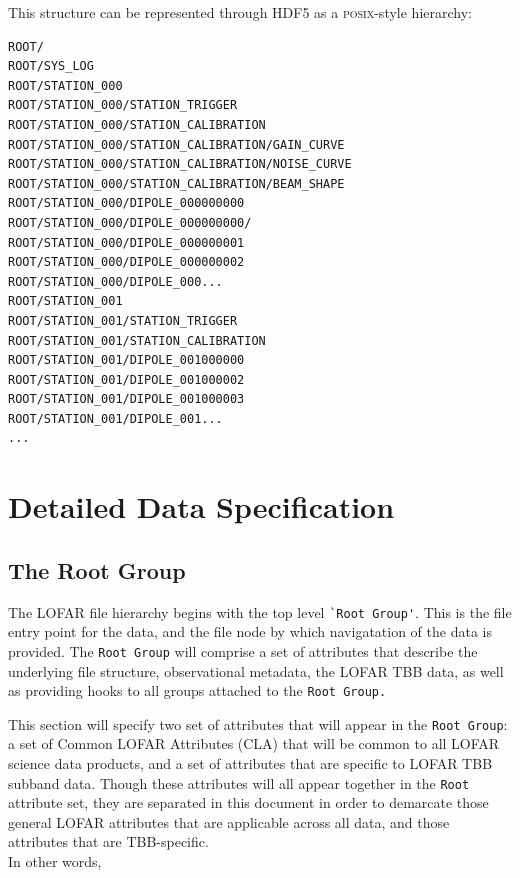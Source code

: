 \documentclass[a4paper,10pt,bibtotoc]{scrartcl}
\begin{document}
This structure can be represented through HDF5 as a \textsc{posix}-style hierarchy:

\begin{lstlisting}
ROOT/
ROOT/SYS_LOG
ROOT/STATION_000
ROOT/STATION_000/STATION_TRIGGER
ROOT/STATION_000/STATION_CALIBRATION
ROOT/STATION_000/STATION_CALIBRATION/GAIN_CURVE
ROOT/STATION_000/STATION_CALIBRATION/NOISE_CURVE
ROOT/STATION_000/STATION_CALIBRATION/BEAM_SHAPE
ROOT/STATION_000/DIPOLE_000000000
ROOT/STATION_000/DIPOLE_000000000/
ROOT/STATION_000/DIPOLE_000000001
ROOT/STATION_000/DIPOLE_000000002
ROOT/STATION_000/DIPOLE_000...
ROOT/STATION_001
ROOT/STATION_001/STATION_TRIGGER
ROOT/STATION_001/STATION_CALIBRATION
ROOT/STATION_001/DIPOLE_001000000
ROOT/STATION_001/DIPOLE_001000002
ROOT/STATION_001/DIPOLE_001000003
ROOT/STATION_001/DIPOLE_001...
...
\end{lstlisting}

\section{Detailed Data Specification}
\label{sec:detailed structure}

\subsection{The Root Group}
\label{sec:root group}

The LOFAR file hierarchy begins with the top level \verb|`Root Group'|.  This is the file entry point for the data, and the file node by which navigatation of the data is provided.  The \texttt{Root Group} will comprise a set of attributes that describe the underlying file structure, observational metadata, the LOFAR TBB data, as well as providing hooks to all groups attached to the \texttt{Root Group.}   

This section will specify two set of attributes that will appear in the \texttt{Root Group}: a set of Common LOFAR Attributes (CLA) that will be common to all LOFAR science data products, and a set of attributes that are specific to LOFAR TBB subband data.  Though these attributes will all appear together in the \texttt{Root} attribute set, they are separated in this document in order to demarcate those general LOFAR attributes that are applicable across all data, and those attributes that are TBB-specific.\\
In other words,
\end{document}
